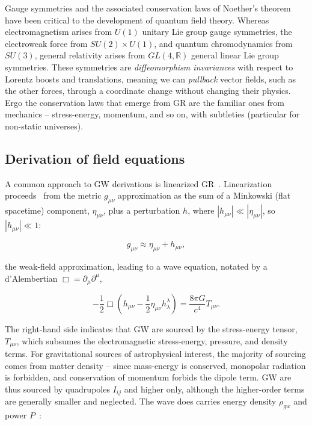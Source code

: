 Gauge symmetries and the associated conservation laws of Noether's theorem have been critical to the development of quantum field theory. 
Whereas electromagnetism arises from $U(1)$ unitary Lie group gauge symmetries, the electroweak force from $SU(2) \times U(1)$, and quantum chromodynamics from $SU(3)$, general relativity arises from $GL(4, \mathbb{R})$ general linear Lie group symmetries. 
These symmetries are \textit{diffeomorphism invariances} with respect to Lorentz boosts and translations, meaning we can \textit{pullback} vector fields, such as the other forces, through a coordinate change without changing their physics.
Ergo the conservation laws that emerge from GR are the familiar ones from mechanics -- stress-energy, momentum, and so on, with subtleties (particular for non-static universes).



        \subsection{Derivation of field equations}
        \label{field_equations}

            A common approach to GW derivations is linearized GR~\cite{FlanaganHughes2005}.
            Linearization proceeds~\cite{AdhikariThesis} from the metric $g_{\mu\nu}$ approximation as the sum of a Minkowski (flat spacetime) component, $\eta_{\mu\nu}$, plus a perturbation $h$, where $|h_{\mu\nu}| \ll |\eta_{\mu\nu}|$, so $|h_{\mu\nu}| \ll 1$:

\begin{equation}
g_{\mu \nu} \approx \eta_{\mu \nu} + h_{\mu \nu},
\label{perturbation_eq}
\end{equation}

\noindent the weak-field approximation, leading to a wave equation, notated by a d'Alembertian $\Box = \partial_\mu \partial^\mu$,

\begin{equation}
-\frac{1}{2} \Box \left(h_{\mu \nu} - \frac{1}{2} \eta_{\mu \nu} h_{\lambda}^{\lambda} \right) = \frac{8 \pi G}{c^4} T_{\mu \nu}.
\end{equation}

The right-hand side indicates that GW are sourced by the stress-energy tensor, $T_{\mu\nu}$, which subsumes the electromagnetic stress-energy, pressure, and density terms. 
For gravitational sources of astrophysical interest, the majority of sourcing comes from matter density -- since mass-energy is conserved, monopolar radiation is forbidden, and conservation of momentum forbids the dipole term. 
GW are thus sourced by quadrupoles $I_{ij}$ and higher only, although the higher-order terms are generally smaller and neglected. 
The wave does carries energy density $\rho_{gw}$ and power $P$~\cite{BallmerThesis}:

